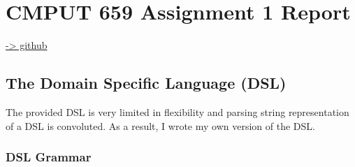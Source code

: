 \documentclass[]{article}
\date{}
\begin{document}
\section{CMPUT 659 Assignment 1
Report}\label{cmput-659-assignment-1-report}

\href{https://github.com/uduse/cmput-659-xai}{-\textgreater{} github}

\subsection{The Domain Specific Language
(DSL)}\label{the-domain-specific-language-dsl}

The provided DSL is very limited in flexibility and parsing string
representation of a DSL is convoluted. As a result, I wrote my own
version of the DSL.

\subsubsection{DSL Grammar}\label{dsl-grammar}
\end{document}
